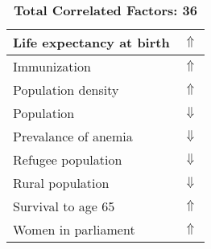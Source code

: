 \documentclass[12pt,notitlepage,oneside]{report}
\begin{document}
\begin{table}[!htb]
\begin{tabular}{|l|l|}
Life expectancy at birth & $\Uparrow$\\ \hline
Immunization & $\Uparrow$\\ \hline
Population density & $\Uparrow$\\ \hline
Population & $\Downarrow$\\ \hline
Prevalance of anemia & $\Downarrow$\\ \hline
Refugee population & $\Downarrow$\\ \hline
Rural population & $\Downarrow$\\ \hline
Survival to age 65 & $\Uparrow$\\ \hline
Women in parliament & $\Uparrow$\\ \hline
\end{tabular}
\caption*{\textbf{Total Correlated Factors: 36}}
\end{table}
\clearpage
\end{document}
